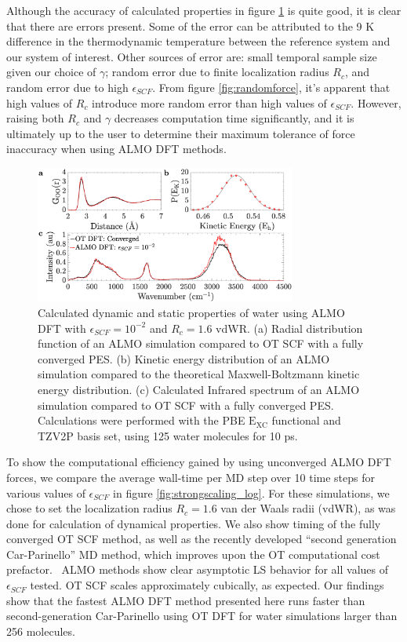 \documentclass[aps,prl,reprint,amsmath,amssymb]{revtex4-1}
\begin{document}
Although the accuracy of calculated properties in figure \ref{fig:dynproperties} is quite good, it is clear that there are errors present.
Some of the error can be attributed to the 9 K difference in the thermodynamic temperature between the reference system and our system of interest.
Other sources of error are: small temporal sample size given our choice of $\gamma$; random error due to finite localization radius $R_{c}$, and random error due to high $\epsilon_{SCF}$.
From figure \ref{fig:randomforce}, it's apparent that high values of $R_{c}$ introduce more random error than high values of $\epsilon_{SCF}$.
However, raising both $R_{c}$ and $\gamma$ decreases computation time significantly, and it is ultimately up to the user to determine their maximum tolerance of force inaccuracy when using ALMO DFT methods.

\begin{figure}
\includegraphics[trim={1.3cm 0.1cm 3.3cm 1.3cm},clip,width=8.6cm]{Dynamical_Data_Tiled.eps}
\caption{\label{fig:dynproperties} Calculated dynamic and static properties of water using ALMO DFT with $\epsilon_{SCF} = 10^{-2}$ and $R_{c} = 1.6$ vdWR.
(a) Radial distribution function of an ALMO simulation compared to OT SCF with a fully converged PES. 
(b) Kinetic energy distribution of an ALMO simulation compared to the theoretical Maxwell-Boltzmann kinetic energy distribution.
(c) Calculated Infrared spectrum of an ALMO simulation compared to OT SCF with a fully converged PES.
Calculations were performed with the PBE $\mathrm{E_{XC}}$ functional and TZV2P basis set, using 125 water molecules for 10 ps.}
\end{figure}


To show the computational efficiency gained by using unconverged ALMO DFT forces, we compare the average wall-time per MD step over 10 time steps for various values of $\epsilon_{SCF}$ in figure \ref{fig:strongscaling_log}.
For these simulations, we chose to set the localization radius $R_{c} = 1.6$ van der Waals radii (vdWR), as was done for calculation of dynamical properties.
We also show timing of the fully converged OT SCF method, as well as the recently developed ``second generation Car-Parinello'' MD method, which improves upon the OT computational cost prefactor.~\cite{a:2ndcpmd}
ALMO methods show clear asymptotic LS behavior for all values of $\epsilon_{SCF}$ tested.
OT SCF scales approximately cubically, as expected.
Our findings show that the fastest ALMO DFT method presented here runs faster than second-generation Car-Parinello using OT DFT for water simulations larger than 256 molecules.
\end{document}
